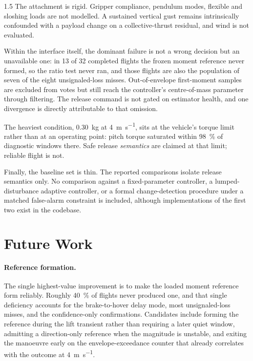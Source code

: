 \begin{spacing}{1.5}
The attachment is rigid. Gripper compliance, pendulum modes, flexible and
sloshing loads are not modelled. A sustained vertical gust remains intrinsically
confounded with a payload change on a collective-thrust residual, and wind is not
evaluated.

Within the interface itself, the dominant failure is not a wrong decision but an
unavailable one: in 13 of 32 completed flights the frozen moment reference never
formed, so the ratio test never ran, and those flights are also the population of
seven of the eight unsignaled-loss misses. Out-of-envelope first-moment samples
are excluded from votes but still reach the controller's centre-of-mass parameter
through filtering. The release command is not gated on estimator health, and one
divergence is directly attributable to that omission.

The heaviest condition, \SI{0.30}{\kg} at \SI{4}{\meter\per\second}, sits at the
vehicle's torque limit rather than at an operating point: pitch torque saturated
within \SI{98}{\percent} of diagnostic windows there. Safe release
\emph{semantics} are claimed at that limit; reliable flight is not.

Finally, the baseline set is thin. The reported comparisons isolate release
semantics only. No comparison against a fixed-parameter controller, a
lumped-disturbance adaptive controller, or a formal change-detection procedure
under a matched false-alarm constraint is included, although implementations of
the first two exist in the codebase.

\section{Future Work}

\paragraph{Reference formation.} The single highest-value improvement is to make
the loaded moment reference form reliably. Roughly \SI{40}{\percent} of flights
never produced one, and that single deficiency accounts for the brake-to-hover
delay mode, most unsignaled-loss misses, and the confidence-only confirmations.
Candidates include forming the reference during the lift transient rather than
requiring a later quiet window, admitting a direction-only reference when the
magnitude is unstable, and exiting the manoeuvre early on the envelope-exceedance
counter that already correlates with the outcome at \SI{4}{\meter\per\second}.


\end{spacing}
